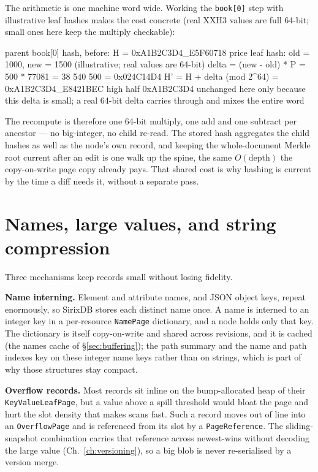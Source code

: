 \documentclass[11pt,a4paper,oneside]{report}
\newcommand{\dcap}[1]{\par\vspace{1pt}\noindent{\small\sffamily\bfseries\color{slate}#1}\par\vspace{-2pt}}
\theoremstyle{sirixthm}
\newcommand{\code}[1]{\texttt{#1}}
\begin{document}
The arithmetic is one machine word wide. Working the \code{book[0]} step with illustrative leaf hashes
makes the cost concrete (real XXH3 values are full 64-bit; small ones here keep the multiply checkable):

\dcap{One Horner step in hex: $h \leftarrow h - h_{old}\cdot P + h_{new}\cdot P$ (mod $2^{64}$, $P=77081$)}
\begin{diagramS}
  parent book[0] hash, before:   H      = 0xA1B2C3D4_E5F60718
  price leaf hash:    old = 1000,  new = 1500      (illustrative; real values are 64-bit)
  delta = (new - old) * P = 500 * 77081 = 38 540 500 = 0x024C14D4
  H' = H + delta (mod 2^64)             = 0xA1B2C3D4_E8421BEC
       high half 0xA1B2C3D4 unchanged here only because this delta is small;
       a real 64-bit delta carries through and mixes the entire word
\end{diagramS}

\noindent The recompute is therefore one 64-bit multiply, one add and one subtract per ancestor --- no
big-integer, no child re-read. The stored hash aggregates the child hashes as well as the node's own
record, and keeping the whole-document Merkle root current after an edit is one
walk up the spine, the same $O(\text{depth})$ the copy-on-write page copy already pays. That shared cost
is why hashing is current by the time a diff needs it, without a separate pass.

\section{Names, large values, and string compression}
\label{sec:names}

Three mechanisms keep records small without losing fidelity.

\textbf{Name interning.} Element and attribute names, and JSON object keys, repeat enormously, so SirixDB
stores each distinct name once. A name is interned to an integer key in a per-resource \code{NamePage}
dictionary, and a node holds only that key. The dictionary is itself copy-on-write and shared across
revisions, and it is cached (the names cache of \S\ref{sec:buffering}); the path summary and the name and
path indexes key on these integer name keys rather than on strings, which is part of why those structures
stay compact.

\textbf{Overflow records.} Most records sit inline on the bump-allocated heap of their
\code{KeyValueLeafPage}, but a value above a spill threshold would bloat the page and hurt the slot
density that makes scans fast. Such a record moves out of line into an \code{OverflowPage} and is
referenced from its slot by a \code{PageReference}. The sliding-snapshot combination carries that
reference across newest-wins without decoding the large value (Ch.~\ref{ch:versioning}), so a big blob is
never re-serialised by a version merge.
\end{document}
